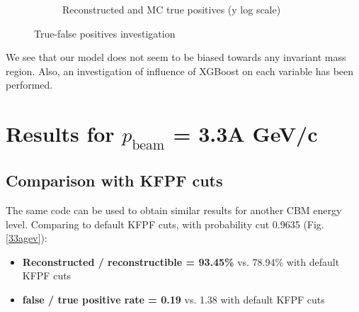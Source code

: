 \documentclass[12pt,a4paper]{report}
\begin{document}
\begin{figure}[h!]
\begin{subfigure}[b]{0.69\linewidth}
        \caption{Reconstructed and MC true positives (y log scale)}
        \vspace{0.3cm}
    \end{subfigure}
    \caption{True-false positives investigation}
    \label{true-false}
\end{figure}
We see that our model does not seem to be biased towards any invariant mass region. Also, an investigation of influence of XGBoost on each variable has been performed.\cite{variables investigation}

\newpage
\section{Results for $p_{\text{beam}}$ = 3.3A GeV/c}

\subsection{Comparison with KFPF cuts}
The same code can be used to obtain similar results for another CBM energy level. Comparing to default KFPF cuts, with probability cut 0.9635 (Fig. \ref{33agev}):
\begin{itemize}
    \item \textbf{Reconstructed \PKshort / reconstructible \PKshort = 93.45\%}  vs. 78.94\% with default KFPF cuts
    \item \textbf{false / true positive rate = 0.19} vs. 1.38 with default KFPF cuts
\end{itemize}
\end{document}
